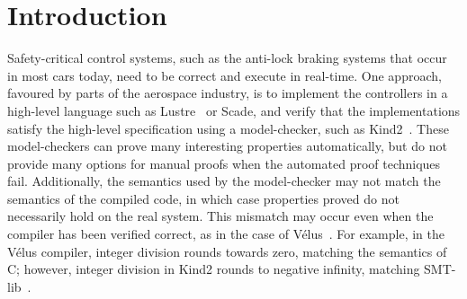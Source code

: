 \documentclass[sigplan,screen, review]{acmart}
\begin{document}



\maketitle

\makeatactive

\section{Introduction}

Safety-critical control systems, such as the anti-lock braking systems that occur in most cars today, need to be correct and execute in real-time.
One approach, favoured by parts of the aerospace industry, is to implement the controllers in a high-level language such as Lustre~\cite{caspi1995functional} or Scade, and verify that the implementations satisfy the high-level specification using a model-checker, such as Kind2~\cite{champion2016kind2}.
These model-checkers can prove many interesting properties automatically, but do not provide many options for manual proofs when the automated proof techniques fail.
Additionally, the semantics used by the model-checker may not match the semantics of the compiled code, in which case properties proved do not necessarily hold on the real system.
This mismatch may occur even when the compiler has been verified correct, as in the case of Vélus~\cite{bourke2017formally}.
For example, in the Vélus compiler, integer division rounds towards zero, matching the semantics of C; however, integer division in Kind2 rounds to negative infinity, matching SMT-lib~\cite{BarFT2016SMTLIB}.
\end{document}
